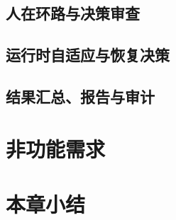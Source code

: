 \subsection{人在环路与决策审查}


\subsection{运行时自适应与恢复决策}


\subsection{结果汇总、报告与审计}


\section{非功能需求}


\section{本章小结}

